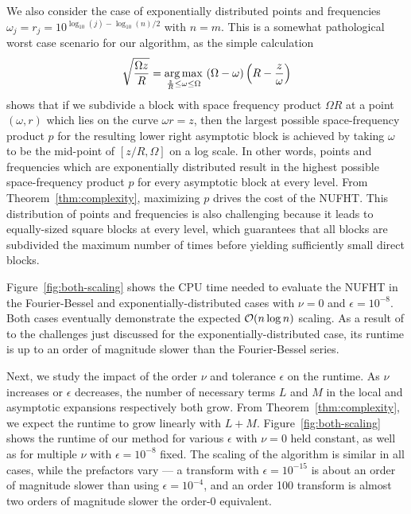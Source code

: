 We also consider the case of exponentially distributed points and frequencies
$\omega_j = r_j = 10^{\log_{10}(j) - \log_{10}(n)/2}$ with $n = m$. This is a
somewhat pathological worst case scenario for our algorithm, as the simple
calculation
\begin{equation}
  \sqrt{\frac{\Omega z}{R}} = \operatorname*{arg\,max}_{\frac{z}{R} \leq \omega \leq \Omega} \ (\Omega - \omega)\left(R - \frac{z}{\omega}\right)
\end{equation}
shows that if we subdivide a block with space frequency product $\Omega R$ at a
point $(\omega, r)$ which lies on the curve $\omega r = z$, then the largest
possible space-frequency product $p$ for the resulting lower right asymptotic
block is achieved by taking $\omega$ to be the mid-point of $[z/R, \Omega]$ on a
log scale. In other words, points and frequencies which are exponentially
distributed result in the highest possible space-frequency product $p$ for every
asymptotic block at every level. From Theorem~\ref{thm:complexity}, maximizing
$p$ drives the cost of the NUFHT. This distribution of points and frequencies is
also challenging because it leads to equally-sized square blocks at every level,
which guarantees that all blocks are subdivided the maximum number of times
before yielding sufficiently small direct blocks.

Figure~\ref{fig:both-scaling} shows the CPU time needed to evaluate the NUFHT in
the Fourier-Bessel and exponentially-distributed cases with $\nu=0$ and
$\epsilon=10^{-8}$. Both cases eventually demonstrate the expected $\mathcal{O}(n\log
n)$ scaling. As a result of to the challenges just discussed for the
exponentially-distributed case, its runtime is up to an order of magnitude
slower than the Fourier-Bessel series.

Next, we study the impact of the order $\nu$ and tolerance $\epsilon$ on the
runtime. As $\nu$ increases or $\epsilon$ decreases, the number of necessary
terms $L$ and $M$ in the local and asymptotic expansions respectively both grow.
From Theorem~\ref{thm:complexity}, we expect the runtime to grow linearly with
$L + M$. Figure~\ref{fig:both-scaling} shows the runtime of our method for
various $\epsilon$ with $\nu=0$ held constant, as well as for multiple $\nu$
with $\epsilon=10^{-8}$ fixed. The scaling of the algorithm is similar in all
cases, while the prefactors vary --- a transform with $\epsilon = 10^{-15}$ is
about an order of magnitude slower than using $\epsilon = 10^{-4}$, and an order
100 transform is almost two orders of magnitude slower the order-0 equivalent.


